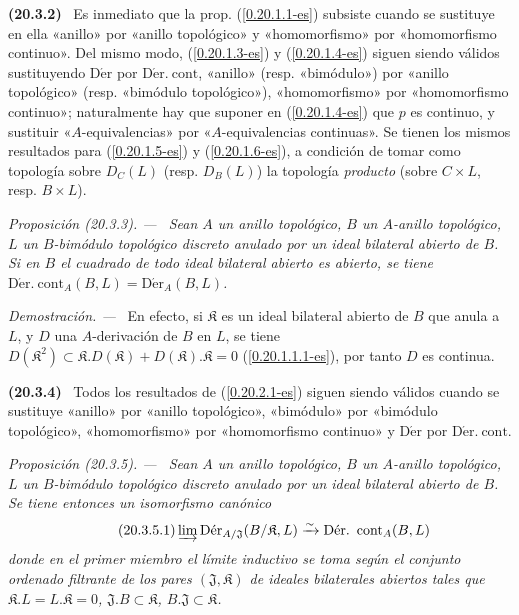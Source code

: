 \documentclass[10pt,oneside]{book}
\makeatletter
\newcommand{\sref}[1]{\textup{(\ref{#1})}}
\newcommand{\setmanualcurrentlabel}[1]{\def\@currentlabel{#1}}
\newenvironment{env}[1][]{\setmanualcurrentlabel{#1}\par\medskip\noindent\textbf{(#1)}\ }{\par}
\newenvironment{proposition}[1][]{%
  \setmanualcurrentlabel{#1}\par\medskip\noindent\itshape Proposición (#1). ---\ }{\par}
\newenvironment{proof}{%
  \par\medskip\noindent\textit{Demostración. ---\ }}{\par}
\makeatother
\begin{document}
\begin{env}[20.3.2]
\label{0.20.3.2-es}
Es inmediato que la prop. \sref{0.20.1.1-es} subsiste cuando se sustituye en ella
«anillo» por «anillo topológico» y «homomorfismo» por
«homomorfismo continuo». Del mismo modo, \sref{0.20.1.3-es} y
\sref{0.20.1.4-es} siguen siendo válidos sustituyendo $\operatorname{D\acute{e}r}$ por
$\operatorname{D\acute{e}r.\ cont}$, «anillo» (resp. «bimódulo») por «anillo
topológico» (resp. «bimódulo topológico»), «homomorfismo» por
«homomorfismo continuo»; naturalmente hay que suponer en
\sref{0.20.1.4-es} que $p$ es continuo, y sustituir «$A$-equivalencias» por
«$A$-equivalencias continuas». Se tienen los mismos resultados para
\sref{0.20.1.5-es} y \sref{0.20.1.6-es}, a condición de tomar como
topología sobre $D_C(L)$ (resp. $D_B(L)$) la topología \emph{producto} (sobre
$C\times L$, resp. $B\times L$).
\end{env}

\begin{proposition}[20.3.3]
\label{0.20.3.3-es}
Sean $A$ un anillo topológico, $B$ un $A$-anillo topológico, $L$ un
$B$-bimódulo topológico discreto anulado por un ideal bilateral abierto de $B$.
Si en $B$ el cuadrado de todo ideal bilateral abierto es abierto, se tiene
$\operatorname{D\acute{e}r.\ cont}_A(B,L)=\operatorname{D\acute{e}r}_A(B,L)$.
\end{proposition}

\begin{proof}
En efecto, si $\mathfrak K$ es un ideal bilateral abierto de $B$ que anula a $L$,
y $D$ una $A$-derivación de $B$ en $L$, se tiene
$D(\mathfrak K^2)\subset\mathfrak K.D(\mathfrak K)+
D(\mathfrak K).\mathfrak K=0$ \sref{0.20.1.1.1-es}, por tanto $D$ es continua.
\end{proof}

\begin{env}[20.3.4]
\label{0.20.3.4-es}
Todos los resultados de \sref{0.20.2.1-es} siguen siendo válidos cuando se sustituye
«anillo» por «anillo topológico», «bimódulo» por «bimódulo
topológico», «homomorfismo» por «homomorfismo continuo» y
$\operatorname{D\acute{e}r}$ por $\operatorname{D\acute{e}r.\ cont}$.
\end{env}

\begin{proposition}[20.3.5]
\label{0.20.3.5-es}
Sean $A$ un anillo topológico, $B$ un $A$-anillo topológico, $L$ un
$B$-bimódulo topológico discreto anulado por un ideal bilateral abierto de $B$.
Se tiene entonces un isomorfismo canónico
\begin{equation}
\tag{20.3.5.1}
\label{0.20.3.5.1-es}
  \varinjlim\operatorname{D\acute{e}r}_{A/\mathfrak{J}}
  (B/\mathfrak K,L)\xrightarrow{\sim}
  \operatorname{D\acute{e}r.\ cont}_A(B,L)
\end{equation}
donde en el primer miembro el límite inductivo se toma según el conjunto
ordenado filtrante de los pares $(\mathfrak{J},\mathfrak K)$ de ideales bilaterales abiertos
tales que $\mathfrak K.L=L.\mathfrak K=0$,
$\mathfrak{J}.B\subset\mathfrak K$,
$B.\mathfrak{J}\subset\mathfrak K$.
\end{proposition}
\end{document}
